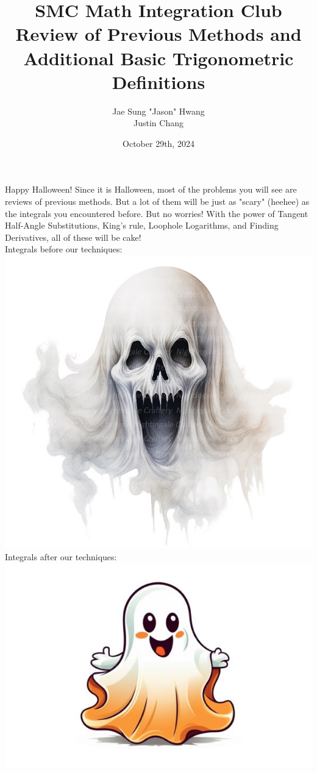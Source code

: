 \documentclass{article}
\title{SMC Math Integration Club\\Review of Previous Methods and \\ Additional Basic Trigonometric Definitions}
\author{Jae Sung "Jason" Hwang\\Justin Chang}
\date{October 29th, 2024}
\begin{document}
\maketitle
\pagebreak

\Large
Happy Halloween! Since it is Halloween, most of the problems you will see are reviews of previous methods.
But a lot of them will be just as "scary" (heehee) as the integrals you encountered before. But no worries!
With the power of Tangent Half-Angle Substitutions, King's rule, Loophole Logarithms, and Finding Derivatives,
all of these will be cake! \\
\newline
Integrals before our techniques:\\
\includegraphics[scale=0.5]{Screen Shot 2024-10-27 at 12.26.29 PM.png}
\\
Integrals after our techniques:\\
\includegraphics[scale=0.5]{Cute-Ghost-Halloween-Clipart-Graphics-76061076-2-580x387.jpg}
\pagebreak
\end{document}
